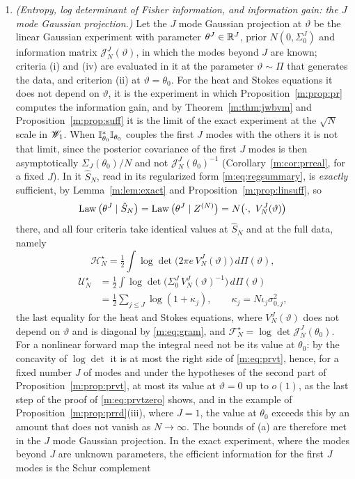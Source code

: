 \begin{proposition}
\begin{enumerate}[label=(\alph*),nosep]
\item \emph{(Entropy, log determinant of Fisher information, and information gain: the $J$ mode Gaussian projection.)} Let the $J$ mode Gaussian projection at $\vartheta$ be the linear Gaussian experiment with parameter $\theta^J\in\mathbb{R}^J$, prior $N(0,\Sigma^J_0)$ and information matrix $\mathcal J^J_N(\vartheta)$, in which the modes beyond $J$ are known; criteria (i) and (iv) are evaluated in it at the parameter $\vartheta\sim\Pi$ that generates the data, and criterion (ii) at $\vartheta=\theta_0$. For the heat and Stokes equations it does not depend on $\vartheta$, it is the experiment in which Proposition~\ref{m:prop:pr} computes the information gain, and by Theorem~\ref{m:thm:jwbvm} and Proposition~\ref{m:prop:suff} it is the limit of the exact experiment at the $\sqrt N$ scale in $\mathscr{W}_1$. When $\mathbb{I}^*_{\theta_0}\mathbb{I}_{\theta_0}$ couples the first $J$ modes with the others it is not that limit, since the posterior covariance of the first $J$ modes is then asymptotically $\Sigma_J(\theta_0)/N$ and not $\mathcal J^J_N(\theta_0)^{-1}$ (Corollary~\ref{m:cor:prreal}, for a fixed $J$). In it $\hat S_N$, read in its regularized form \eqref{m:eq:regsummary}, is \emph{exactly} sufficient, by Lemma~\ref{m:lem:exact} and Proposition~\ref{m:prop:linsuff}, so
\[
\Law\big(\theta^J\mid\hat S_N\big)=\Law\big(\theta^J\mid Z^{(N)}\big)=N\big(\cdot,\ V^J_N(\vartheta)\big)
\]
there, and all four criteria take identical values at $\hat S_N$ and at the full data, namely
\[
\mathcal H^\star_N=\tfrac12\int\log\det\big(2\pi e\,V^J_N(\vartheta)\big)\,d\Pi(\vartheta) ,
\]
\[
\begin{aligned}
\mathcal U^\star_N&=\tfrac12\int\log\det\big(\Sigma^J_0\,V^J_N(\vartheta)^{-1}\big)\,d\Pi(\vartheta)\\
&=\tfrac12\sum_{j\le J}\log(1+\kappa_j),\qquad\kappa_j=N\iota_j\sigma^2_{0,j} ,
\end{aligned}
\]
the last equality for the heat and Stokes equations, where $V^J_N(\vartheta)$ does not depend on $\vartheta$ and is diagonal by \eqref{m:eq:gram}, and $\mathcal F^\star_N=\log\det\mathcal J^J_N(\theta_0)$. For a nonlinear forward map the integral need not be its value at $\theta_0$: by the concavity of $\log\det$ it is at most the right side of \eqref{m:eq:prvt}, hence, for a fixed number $J$ of modes and under the hypotheses of the second part of Proposition~\ref{m:prop:prvt}, at most its value at $\vartheta=0$ up to $o(1)$, as the last step of the proof of \eqref{m:eq:prvtzero} shows, and in the example of Proposition~\ref{m:prop:prrd}(iii), where $J=1$, the value at $\theta_0$ exceeds this by an amount that does not vanish as $N\to\infty$. The bounds of (a) are therefore met in the $J$ mode Gaussian projection. In the exact experiment, where the modes beyond $J$ are unknown parameters, the efficient information for the first $J$ modes is the Schur complement

\end{enumerate}
\end{proposition}

